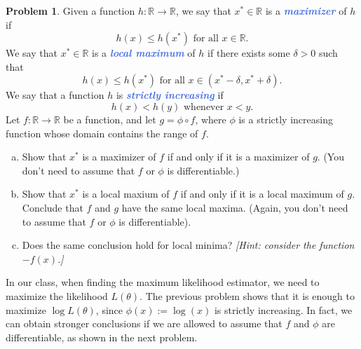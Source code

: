 \documentclass[10pt]{article}
\theoremstyle{definition}
\newtheorem{problem}[theorem]{Problem}
\newcommand{\1}[1]{\textbf{1}_{\left[#1\right]}} %
\def\R{\mathbb{R}} %
\newcommand{\demph}[1]{\textcolor{RoyalBlue}{\textbf{\slshape #1}}} %
\begin{document}
\begin{problem}
  \label{problem:increasing-functions-and-maximizers}
  Given a function $h:\R \to \R$, we say that $x^{*}\in \R$ is a \demph{maximizer}
  of $h$ if
  \begin{equation*}
    h(x) \leq h(x^{*}) \text{ for all }x\in \R.
  \end{equation*}
  We say that $x^{*}\in \R$ is a \demph{local maximum} of $h$ if there exists
  some $\delta>0$ such that
  \begin{equation*}
    h(x) \leq h(x^{*}) \text{ for all }x\in (x^{*}-\delta,x^{*}+\delta).
  \end{equation*}
  We say that a function $h$ is \demph{strictly increasing} if
  \begin{equation*}
    h(x) < h(y) \text{ whenever } x<y.
  \end{equation*}
  Let $f:\R \to \R$ be a function, and let $g = \phi\circ f$, where $\phi$ is
  a strictly increasing function whose domain contains the range of $f$.
  \begin{enumerate}[(a)]
    \item \label{item:3} Show that $x^{*}$ is a maximizer of $f$ if and only
    if it is a maximizer of $g$. (You don't need to assume that $f$ or $\phi$
    is differentiable.)
    \item Show that $x^{*}$ is a local maxium of $f$ if and only if it is a
    local maximum of $g$. Conclude that $f$ and $g$ have the same local
    maxima. (Again, you don't need to assume that $f$ or $\phi$ is
    differentiable).
    \item Does the same conclusion hold for local minima? \textit{[Hint:
      consider the function $-f(x)$.]}
  \end{enumerate}
\end{problem}

In our class, when finding the maximum likelihood estimator, we need to
maximize the likelihood $L(\theta)$. The previous problem shows that it is
enough to maximize $\log L(\theta)$, since $\phi(x):=\log(x)$ is strictly
increasing. In fact, we can obtain stronger conclusions if we are allowed to
assume that $f$ and $\phi$ are differentiable, as shown in the next problem.
\end{document}
